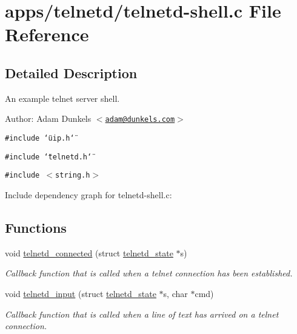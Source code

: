 \hypertarget{a00045}{
\section{apps/telnetd/telnetd-shell.c File Reference}
\label{a00045}
}


\subsection{Detailed Description}
An example telnet server shell. 

\begin{Desc}
\item[Author:]Adam Dunkels $<$\href{mailto:adam@dunkels.com}{\tt adam@dunkels.com}$>$ \end{Desc}


{\tt \#include \char`\"{}uip.h\char`\"{}}\par
{\tt \#include \char`\"{}telnetd.h\char`\"{}}\par
{\tt \#include $<$string.h$>$}\par


Include dependency graph for telnetd-shell.c:\subsection*{Functions}
\begin{CompactItemize}
\item 
void \hyperlink{a00081_g992adc34dbe12cd28c2e5cc4c043b461}{telnetd\_\-connected} (struct \hyperlink{a00027}{telnetd\_\-state} $\ast$s)
\begin{CompactList}\small\item\em Callback function that is called when a telnet connection has been established. \item\end{CompactList}\item 
void \hyperlink{a00081_ge639174c3eb987213a3ff0b1e138da26}{telnetd\_\-input} (struct \hyperlink{a00027}{telnetd\_\-state} $\ast$s, char $\ast$cmd)
\begin{CompactList}\small\item\em Callback function that is called when a line of text has arrived on a telnet connection. \item\end{CompactList}\end{CompactItemize}
